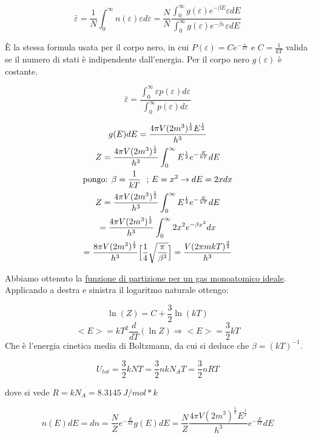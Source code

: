 $$ \bar\varepsilon =  \frac{1}{N} \int_0^{\infty} n(\varepsilon) \varepsilon d\varepsilon = \frac{N}{N} \frac{\int_0^{\infty} g(\varepsilon) e^{- \beta E} \varepsilon dE}{\int_0^{\infty} g(\varepsilon) e^{- \beta \varepsilon} \varepsilon dE }$$

È la stessa formula usata per il corpo nero, in cui $P(\varepsilon) = C e^{- \frac{\varepsilon}{k T}} $ e $ C = \frac{1}{k T}$ valida se il numero di stati è indipendente dall'energia. Per il corpo nero $g(\varepsilon)$ è costante.

$$ \bar\varepsilon =   \frac{\int_0^{\infty} \varepsilon p(\varepsilon) d \varepsilon}{\int_0^{\infty} p(\varepsilon) d \varepsilon}$$

\begin{gather*} \label{fun_partizione}
g(E)dE = \frac{4 \pi V (2m^3)^\frac{1}{2}  E^\frac{1}{2} }{ h^3 } \\
Z =  \frac{4 \pi V (2m^3)^\frac{1}{2} }{ h^3 }  \int_0^{\infty}  E^\frac{1}{2} e^{- \frac{E}{k T}}  dE \\
\mbox{pongo: } \beta = \frac{1}{k T} \mbox{ \space ;  }  E = x^2  \rightarrow dE = 2x dx \\
Z =  \frac{4 \pi V (2m^3)^\frac{1}{2} }{ h^3 }  \int_0^{\infty}  E^\frac{1}{2} e^{- \frac{E}{k T}}  dE \\
= \frac{4 \pi V (2m^3)^\frac{1}{2} }{ h^3 } \int_0^{\infty} 2x^2 e^{- \beta x^2 } dx \\
= \frac{8 \pi V (2m^3)^\frac{1}{2} }{ h^3 } \Bigl[  \frac{1}{4} \sqrt{\frac{\pi}{\beta^3}}  \Bigr] 
= \frac{V (2 \pi m k T)^\frac{3}{2}}{h^3}
\end{gather*}

Abbiamo ottenuto la \underline{funzione di partizione per un gas monoatomico ideale}.
Applicando a destra e sinistra il logaritmo naturale ottengo:

$$ \ln (Z) = C + \frac{3}{2} \ln ( k T ) $$
$$ <E> = k T^2 \frac{d}{dT} (\ln Z)  \Rightarrow <E> = \frac{3}{2} k T$$
Che è l'energia cinetica media di Boltzmann, da cui si deduce che $\beta = (k T)^{-1}$.

$$  U_{tot} =  \frac{3}{2} k N T = \frac{3}{2} n k N_A T = \frac{3}{2} n R T $$

dove si vede $R = k N_A = \SI{8.3145}{J / mol * k}$

\begin{equation} 
n(E) dE = d n = \frac{N}{Z} e^{- \frac{E}{k T} } g(E) dE = \frac{N}{Z} \frac{4 \pi V (2m^3)^\frac{1}{2} E^\frac{1}{2} }{ h^3 } e^{- \frac{E}{k T}}  dE 
\end{equation}


